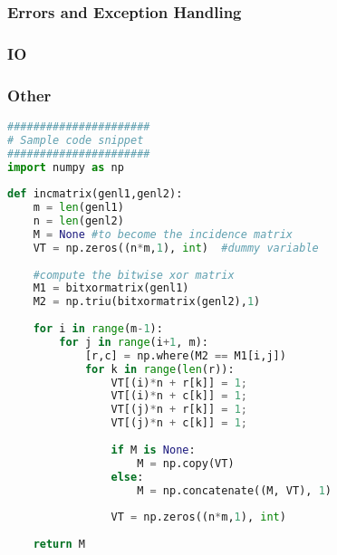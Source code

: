 \subsubsection{Errors and Exception Handling}

\subsubsection{IO}

\subsubsection{Other}


\begin{lstlisting}[language=Python]
######################
# Sample code snippet
######################
import numpy as np
 
def incmatrix(genl1,genl2):
    m = len(genl1)
    n = len(genl2)
    M = None #to become the incidence matrix
    VT = np.zeros((n*m,1), int)  #dummy variable
 
    #compute the bitwise xor matrix
    M1 = bitxormatrix(genl1)
    M2 = np.triu(bitxormatrix(genl2),1) 
 
    for i in range(m-1):
        for j in range(i+1, m):
            [r,c] = np.where(M2 == M1[i,j])
            for k in range(len(r)):
                VT[(i)*n + r[k]] = 1;
                VT[(i)*n + c[k]] = 1;
                VT[(j)*n + r[k]] = 1;
                VT[(j)*n + c[k]] = 1;
 
                if M is None:
                    M = np.copy(VT)
                else:
                    M = np.concatenate((M, VT), 1)
 
                VT = np.zeros((n*m,1), int)
 
    return M
\end{lstlisting}

